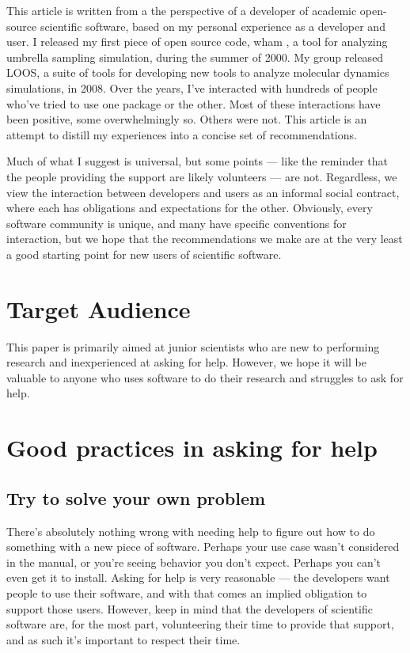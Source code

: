 \documentclass[9pt,training]{livecoms}
\begin{document}
This article is written from a the perspective of a developer of academic
open-source scientific software, based on my personal experience as a developer
and user. I released my first piece of open source code, wham \cite{WHAM}, a
tool for analyzing umbrella sampling simulation,  during the summer of 2000.  My
group released LOOS\cite{Grossfield-2009, LOOS-JCC}, a suite of tools for
developing new tools to analyze molecular dynamics simulations, in 2008. Over
the years, I've interacted with hundreds of people who've tried to use one
package or the other. Most of these interactions have been positive, some
overwhelmingly so. Others were not. This article is an attempt to distill my
experiences into a concise set of recommendations.

Much of what I suggest is universal, but some points --- like the
reminder that the people providing the support are likely volunteers --- are
not.  Regardless, we view the interaction between developers and users as an
informal social contract, where each has obligations and expectations for the
other. Obviously, every software community is unique, and many have specific
conventions for interaction, but we hope that the recommendations we make are at
the very least a good starting point for new users of scientific software.



\section{Target Audience}

This paper is primarily aimed at junior scientists who are new to performing
research and inexperienced at asking for help. However, we hope it will be
valuable to anyone who uses software to do their research and struggles to ask
for help.

\section{Good practices in asking for help}

\subsection{Try to solve your own problem}
\label{ss:yourself}

There's absolutely nothing wrong with needing help to figure out how to do
something with a new piece of software. Perhaps your use case wasn't considered
in the manual, or you're seeing behavior you don't expect. Perhaps you can't
even get it to install. Asking for help is very reasonable --- the developers
want people to use their software, and with that comes an implied obligation to
support those users. However, keep in mind that the developers of scientific
software are, for the most part, volunteering their time to provide that
support, and as such it's important to respect their time.
\end{document}
